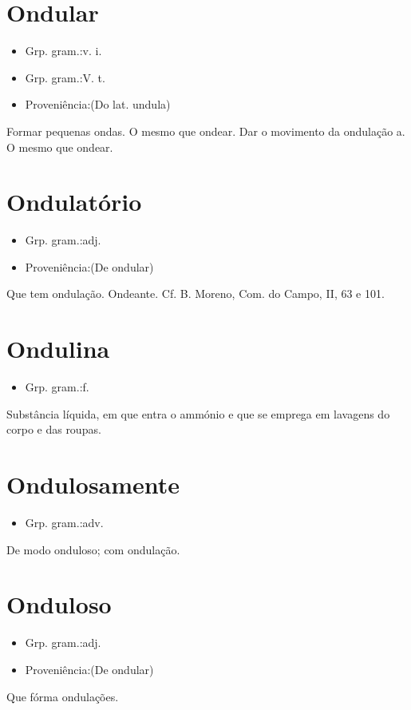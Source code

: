 \section{Ondular}
\begin{itemize}
\item {Grp. gram.:v. i.}
\end{itemize}
\begin{itemize}
\item {Grp. gram.:V. t.}
\end{itemize}
\begin{itemize}
\item {Proveniência:(Do lat. \textunderscore undula\textunderscore )}
\end{itemize}
Formar pequenas ondas.
O mesmo que \textunderscore ondear\textunderscore .
Dar o movimento da ondulação a.
O mesmo que \textunderscore ondear\textunderscore .
\section{Ondulatório}
\begin{itemize}
\item {Grp. gram.:adj.}
\end{itemize}
\begin{itemize}
\item {Proveniência:(De \textunderscore ondular\textunderscore )}
\end{itemize}
Que tem ondulação.
Ondeante. Cf. B. Moreno, \textunderscore Com. do Campo\textunderscore , II, 63 e 101.
\section{Ondulina}
\begin{itemize}
\item {Grp. gram.:f.}
\end{itemize}
Substância líquida, em que entra o ammónio e que se emprega em lavagens do corpo e das roupas.
\section{Ondulosamente}
\begin{itemize}
\item {Grp. gram.:adv.}
\end{itemize}
De modo onduloso; com ondulação.
\section{Onduloso}
\begin{itemize}
\item {Grp. gram.:adj.}
\end{itemize}
\begin{itemize}
\item {Proveniência:(De \textunderscore ondular\textunderscore )}
\end{itemize}
Que fórma ondulações.
